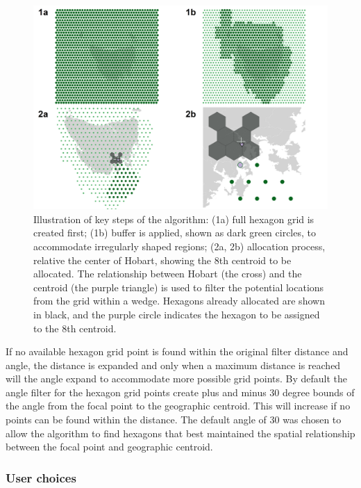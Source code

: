 \begin{figure}
\includegraphics[width=0.95\linewidth]{kobakian-cook_files/figure-latex/filterprocess-1} \caption{Illustration of key steps of the algorithm: (1a) full hexagon grid is created first; (1b) buffer is applied, shown as dark green circles, to accommodate irregularly shaped regions; (2a, 2b) allocation process, relative the center of Hobart, showing the 8th centroid to be allocated. The relationship between Hobart (the cross) and the centroid (the purple triangle) is used to filter the potential locations from the grid within a wedge. Hexagons already allocated are shown in black, and the purple circle indicates the hexagon to be assigned to the 8th centroid.}\label{fig:filterprocess}
\end{figure}

If no available hexagon grid point is found within the original filter distance and angle, the distance is expanded and only when a maximum distance is reached will the angle expand to accommodate more possible grid points.
By default the angle filter for the hexagon grid points create plus and minus 30 degree bounds of the angle from the focal point to the geographic centroid. This will increase if no points can be found within the  distance. The default angle of 30 was chosen to allow the algorithm to find hexagons that best maintained the spatial relationship between the focal point and geographic centroid.

\hypertarget{user-choices}{%
\subsubsection{User choices}\label{user-choices}}

